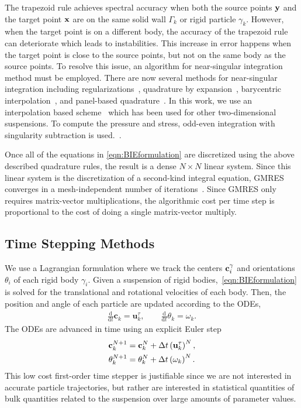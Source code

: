 \documentclass[preprint, 10pt]{elsarticle}
\begin{document}
The trapezoid rule achieves spectral accuracy when both the source
points ${\mathbf{y}}$ and the target point ${\mathbf{x}}$ are on the same solid wall
$\Gamma_k$ or rigid particle $\gamma_k$.  However, when the target point
is on a different body, the accuracy of the trapezoid rule can
deteriorate which leads to instabilities.  This increase in error
happens when the target point is close to the source points, but not on
the same body as the source points.  To resolve this issue, an algorithm
for near-singular integration method must be employed.  There are now
several methods for near-singular integration including
regularizations~\cite{Beale2001}, quadrature by
expansion~\cite{Klockner2013}, barycentric
interpolation~\cite{Barnett2015}, and panel-based
quadrature~\cite{Helsing2008}.  In this work, we use an interpolation
based scheme~\cite{Ying2006} which has been used for other
two-dimensional suspensions.  To compute the pressure and stress, odd-even integration with singularity subtraction is used.~\cite{Quaife2014}.

Once all of the
equations in \eqref{eqn:BIEformulation} are discretized using the above
described
quadrature rules, the result is a dense $N \times N$ linear system.
Since this linear system is the discretization of a second-kind integral
equation, GMRES~\cite{Saad1986} converges in a mesh-independent number of
iterations~\cite{Campbell1996}.  Since GMRES only requires
matrix-vector multiplications, the algorithmic cost per time step is
proportional to the cost of doing a single matrix-vector multiply.


\subsection{Time Stepping Methods}
\label{sec:temporal}

We use a Lagrangian formulation where we track the centers
${\mathbf{c}}_i^\gamma$ and orientations $\theta_i$ of each rigid body
$\gamma_i$. Given a suspension of rigid
bodies,~\eqref{eqn:BIEformulation} is solved for the translational and
rotational velocities of each body. Then, the position and angle of each
particle are updated according to the ODEs,
\begin{align*}
  \frac{\text{d}}{\text{d}t}\mathbf{c}_k = \mathbf{u}^\tau_k, \qquad
  \frac{\text{d}}{\text{d}t}\theta_k =\omega_k.
\end{align*}
The ODEs are advanced in time using an explicit Euler step
\begin{align*}
  {\mathbf{c}}_k^{N+1} &= {\mathbf{c}}_k^N + \Delta t \left({\mathbf{u}}_k^\tau\right)^N, \\
  \theta_k^{N+1} &= \theta_k^N + \Delta t \left(\omega_k\right)^N.
\end{align*}
This low cost first-order time stepper is justifiable since we are
not interested in accurate particle trajectories, but rather are
interested in statistical quantities of bulk quantities related to the
suspension over large amounts of parameter values.
\end{document}
